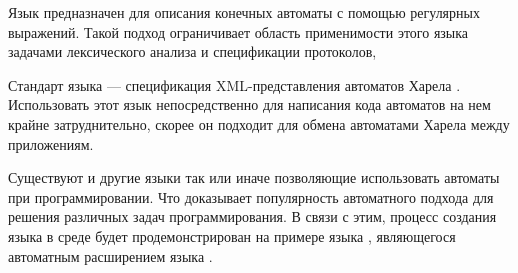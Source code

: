Язык  предназначен для описания конечных автоматы с помощью регулярных выражений. Такой подход ограничивает 
область применимости этого языка задачами лексического анализа и спецификации протоколов,

Стандарт языка  --- спецификация XML-представления автоматов Харела \cite{harel}. Использовать этот язык 
непосредственно для написания кода автоматов на нем крайне затруднительно, скорее он подходит для обмена автоматами Харела
между приложениям.

Существуют и другие языки так или иначе позволяющие использовать автоматы при программировании. Что доказывает популярность
автоматного подхода для решения различных задач программирования. В связи с этим, процесс создания языка в среде \MPS{}
будет продемонстрирован на примере языка , являющегося автоматным расширением
языка .
